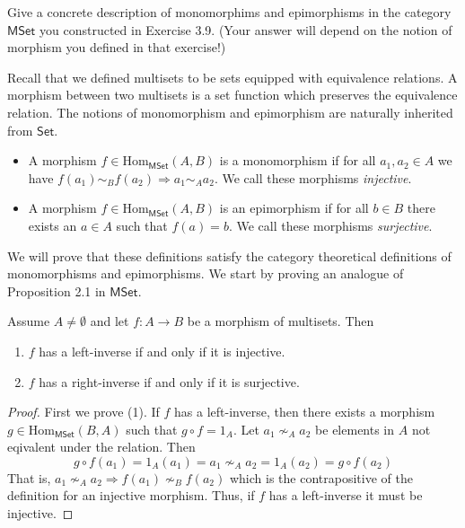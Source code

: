 \documentclass[../../master.tex]{subfiles}
\begin{document}
    \begin{problem}
      Give a concrete description of monomorphims and epimorphisms in the category \(\mathsf{MSet}\) you constructed in Exercise 3.9.
      (Your answer will depend on the notion of morphism you defined in that exercise!)
    \end{problem}

    \begin{solution}
      Recall that we defined multisets to be sets equipped with equivalence relations.
      A morphism between two multisets is a set function which preserves the equivalence relation.
      The notions of monomorphism and epimorphism are naturally inherited from \(\mathsf{Set}\).
      \begin{itemize}
        \item A morphism \(f \in \text{Hom}_{\mathsf{MSet}}(A, B)\) is a monomorphism if for all \(a_{1}, a_{2} \in A\) we have
        \(f(a_{1}) \sim_{B} f(a_{2}) \Longrightarrow a_{1} \sim_{A} a_{2}\). We call these morphisms \textit{injective}.
        \item A morphism \(f \in \text{Hom}_{\mathsf{MSet}}(A, B)\) is an epimorphism if for all \(b \in B\) there exists an \(a \in A\) such that \(f(a) = b\). We call these morphisms \textit{surjective}.
      \end{itemize}
      We will prove that these definitions satisfy the category theoretical definitions of monomorphisms and epimorphisms.
      We start by proving an analogue of Proposition 2.1 in \(\mathsf{MSet}\).
      \begin{proposition}[Lemma]
        Assume \(A \neq \emptyset\) and let \(f: A \to B\) be a morphism of multisets. Then
        \begin{enumerate}
          \item \(f\) has a left-inverse if and only if it is injective.
          \item \(f\) has a right-inverse if and only if it is surjective.
        \end{enumerate}
      \end{proposition}
      \begin{proof}
        First we prove (1). If \(f\) has a left-inverse, then there exists a morphism \(g \in \text{Hom}_{\mathsf{MSet}}(B, A)\) such that \(g \circ f = 1_{A}\).
        Let \(a_{1} \nsim_{A} a_{2}\) be elements in \(A\) not eqivalent under the relation.
        Then
        \begin{equation*}
          g \circ f(a_{1}) = 1_{A}(a_{1}) = a_{1} \nsim_{A} a_{2} = 1_{A}(a_{2}) = g \circ f(a_{2})
        \end{equation*}
        That is, \(a_{1} \nsim_{A} a_{2} \Longrightarrow f(a_{1}) \nsim_{B} f(a_{2})\) which is the contrapositive of the definition for an injective morphism.
        Thus, if \(f\) has a left-inverse it must be injective.


\end{proof}
\end{solution}
\end{document}
